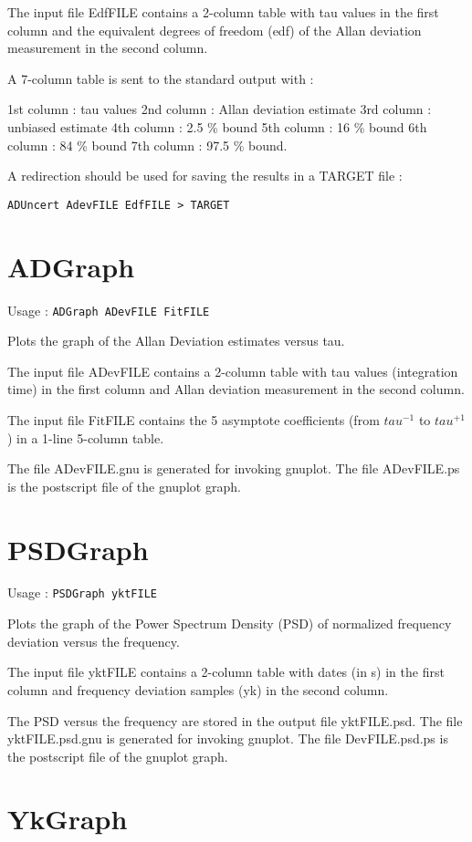\documentclass[12pt,a4paper,french]{article}
\begin{document}
The input file EdfFILE contains a 2-column table with tau values in the first column and the equivalent degrees of freedom (edf) of the Allan deviation measurement in the second column.

A 7-column table is sent to the standard output with :

    1st column : tau values
    2nd column : Allan deviation estimate
    3rd column : unbiased estimate
    4th column : 2.5 \% bound
    5th column : 16 \% bound
    6th column : 84 \% bound
    7th column : 97.5 \% bound.

A redirection should be used for saving the results in a TARGET file : 

{\tt{ADUncert AdevFILE EdfFILE > TARGET}

\section{ADGraph}

Usage : {\tt{ADGraph ADevFILE FitFILE}}

Plots the graph of the Allan Deviation estimates versus tau.

The input file ADevFILE contains a 2-column table with tau values (integration time) in the first column and Allan deviation measurement in the second column.

The input file FitFILE contains the 5 asymptote coefficients (from $tau^{-1}$ to $tau^{+1}$) in a 1-line 5-column table.

The file ADevFILE.gnu is generated for invoking gnuplot.
The file ADevFILE.ps is the postscript file of the gnuplot graph.

\section{PSDGraph}

Usage : {\tt{PSDGraph yktFILE}}

Plots the graph of the Power Spectrum Density (PSD) of normalized frequency deviation versus the frequency.

The input file yktFILE contains a 2-column table with dates (in s) in the first column and frequency deviation samples (yk) in the second column.

The PSD versus the frequency are stored in the output file yktFILE.psd.
The file yktFILE.psd.gnu is generated for invoking gnuplot.
The file DevFILE.psd.ps is the postscript file of the gnuplot graph.

\section{YkGraph}

}
\end{document}
